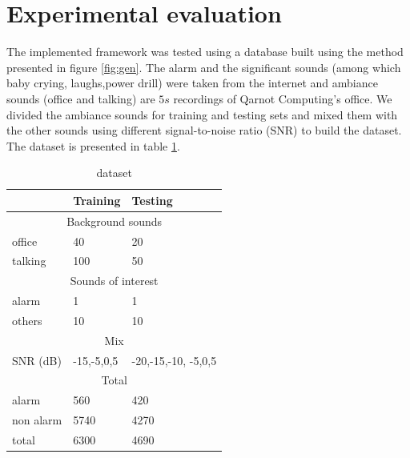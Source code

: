 \documentclass[10pt, conference, compsocconf]{IEEEtran}
\begin{document}
\section{Experimental evaluation} \label{Proof-of-concept}
The implemented framework was tested using a database built using the method presented in figure \ref{fig:gen}. The alarm and the significant sounds (among which baby crying, laughs,power drill) were taken from the internet and ambiance sounds (office and talking) are $5s$ recordings of Qarnot Computing's office. We divided the ambiance sounds for training and testing sets and mixed them with the other sounds using different signal-to-noise ratio (SNR) to build the dataset. The dataset is presented in table \ref{table:dataset}.
\begin{table}[h]
  \scriptsize
  \centering
  \begin{tabular}{|*{3}{l|}}
    \hline
    & Training & Testing \\
    \hline
    \multicolumn{3}{|c|}{Background sounds} \\
    \hline
    office & 40 & 20\\
    talking & 100 & 50 \\
    \hline
    \multicolumn{3}{|c|}{Sounds of interest} \\
    \hline
    alarm & 1 & 1 \\
    others & 10 & 10 \\
    \hline
    \multicolumn{3}{|c|}{Mix} \\
    \hline
    SNR (dB)& -15,-5,0,5 & -20,-15,-10, -5,0,5 \\
    \hline
    \multicolumn{3}{|c|}{Total} \\ 
    \hline
    alarm & 560 & 420 \\
    non alarm & 5740 & 4270 \\
    total & 6300 & 4690 \\
   \hline
  \end{tabular}
\caption{dataset \label{table:dataset}}
\end{table}
\end{document}
